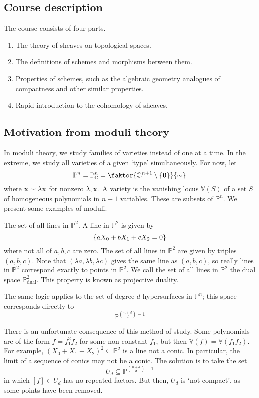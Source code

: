 \subsection{Course description}
The course consists of four parts.
\begin{enumerate}
    \item The theory of sheaves on topological spaces.
    \item The definitions of schemes and morphisms between them.
    \item Properties of schemes, such as the algebraic geometry analogues of compactness and other similar properties.
    \item Rapid introduction to the cohomology of sheaves.
\end{enumerate}

\subsection{Motivation from moduli theory}
In moduli theory, we study families of varieties instead of one at a time.
In the extreme, we study all varieties of a given `type' simultaneously.
For now, let
\[ \mathbb P^n = \mathbb P^n_{\mathbb C} = \faktor{\mathbb C^{n+1} \setminus \qty{\vb 0}}{\sim} \]
where \( \vb x \sim \lambda \vb x \) for nonzero \( \lambda, \vb x \).
A variety is the vanishing locus \( \mathbb V(S) \) of a set \( S \) of homogeneous polynomials in \( n + 1 \) variables.
These are subsets of \( \mathbb P^n \).
We present some examples of moduli.
\begin{example}
    The set of all lines in \( \mathbb P^2 \).
    A line in \( \mathbb P^2 \) is given by
    \[ \qty{aX_0 + bX_1 + cX_2 = 0} \]
    where not all of \( a, b, c \) are zero.
    The set of all lines in \( \mathbb P^2 \) are given by triples \( (a, b, c) \).
    Note that \( (\lambda a, \lambda b, \lambda c) \) gives the same line as \( (a, b, c) \), so really lines in \( \mathbb P^2 \) correspond exactly to points in \( \mathbb P^2 \).
    We call the set of all lines in \( \mathbb P^2 \) the dual space \( \mathbb P^2_{\text{dual}} \).
    This property is known as projective duality.

    The same logic applies to the set of degree \( d \) hypersurfaces in \( \mathbb P^n \); this space corresponds directly to
    \[ \mathbb P^{\binom{n+d}{d} - 1} \]
\end{example}
There is an unfortunate consequence of this method of study.
Some polynomials are of the form \( f = f_1^2 f_2 \) for some non-constant \( f_1 \), but then \( \mathbb V(f) = \mathbb V(f_1 f_2) \).
For example, \( (X_0 + X_1 + X_2)^2 \subseteq \mathbb P^2 \) is a line not a conic.
In particular, the limit of a sequence of conics may not be a conic.
The solution is to take the set
\[ U_d \subseteq \mathbb P^{\binom{n+d}{d} - 1} \]
in which \( [f] \in U_d \) has no repeated factors.
But then, \( U_d \) is `not compact', as some points have been removed.

